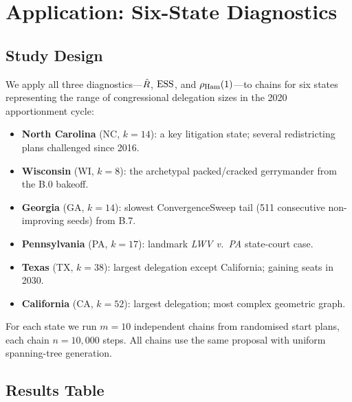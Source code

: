 \section{Application: Six-State Diagnostics}
\label{sec:application}

\subsection{Study Design}

We apply all three diagnostics---$\hat{R}$, $\mathrm{ESS}$, and $\rho_{\mathrm{Ham}}(1)$---to
\recom{} chains for six states representing the range of congressional
delegation sizes in the 2020 apportionment cycle:
\begin{itemize}
\item \textbf{North Carolina} (NC, $k = 14$): a key litigation state;
      several redistricting plans challenged since 2016.
\item \textbf{Wisconsin} (WI, $k = 8$): the archetypal packed/cracked
      gerrymander from the B.0 bakeoff.
\item \textbf{Georgia} (GA, $k = 14$): slowest ConvergenceSweep tail
      (511 consecutive non-improving seeds) from B.7.
\item \textbf{Pennsylvania} (PA, $k = 17$): landmark \textit{LWV v.\ PA}
      state-court case.
\item \textbf{Texas} (TX, $k = 38$): largest delegation except California;
      gaining seats in 2030.
\item \textbf{California} (CA, $k = 52$): largest delegation; most complex
      geometric graph.
\end{itemize}

For each state we run $m = 10$ independent chains from randomised start
plans, each chain $n = 10{,}000$ steps.
All chains use the same \recom{} proposal with uniform spanning-tree
generation.

\subsection{Results Table}

